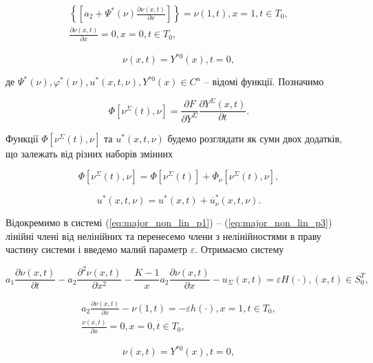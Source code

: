 \begin{equation}
\label{eq:major_non_lin_p2}
\begin{multlined}
\left\{[a_2 + \Psi^*(\nu)\frac{\partial\nu(x, t)}{\partial x}] \right\} = \nu(1, t), x = 1, t\in T_0, \\
\frac{\partial\nu(x, t)}{\partial x} = 0, x = 0, t\in T_0,
\end{multlined}
\end{equation}

\begin{equation}
\label{eq:major_non_lin_p3}
\nu(x, t) = Y^{*0}(x), t = 0,
\end{equation}

де $\Psi^*(\nu), \varphi^*(\nu), u^*(x,t, \nu), Y^{*0}(x) \in C^n$ – відомі функції.
Позначимо

$$\Phi[\nu^\Sigma(t), \nu] = \frac{\partial F}{\partial Y^\Sigma} \frac{\partial Y^\Sigma(x, t)}{\partial t}.$$

Функції $\Phi[\nu^\Sigma(t), \nu]$ та $u^*(x, t, \nu)$ будемо розглядати як суми двох додатків,
що залежать від різних наборів змінних

$$
\Phi[\nu^\Sigma(t), \nu] = \Phi[\nu^\Sigma(t)] + \overline{\Phi}_\nu[\nu^\Sigma(t), \nu],
$$

$$
u^*(x, t, \nu) = u^*(x, t) + \overline{u}_\nu^*(x, t, \nu).
$$

Відокремимо в системі (\ref{eq:major_non_lin_p1}) -- (\ref{eq:major_non_lin_p3}) лінійні члені від нелінійних
та перенесемо члени з
нелінійностями в праву частину системи і введемо малий параметр $\varepsilon$. Отримаємо систему

\begin{equation}
\label{eq:major_non_lin_epsi_p1}
a_1\frac{\partial\nu(x, t)}{\partial t} - a_2\frac{\partial^2\nu(x, t)}{\partial x^2} - \frac{K - 1}{x}a_2
\frac{\partial\nu(x, t)}{\partial x} - u_\Sigma(x, t) = \varepsilon H(\cdot), (x,t) \in S_0^T,
\end{equation}

\begin{equation}
\label{eq:major_non_lin_epsi_p2}
\begin{multlined}
a_2\frac{\partial\nu(x, t)}{\partial x} - \nu(1, t) = - \varepsilon h(\cdot), x = 1, t \in T_0,\\
\frac{\nu(x, t)}{\partial x} = 0, x = 0, t \in T_0,
\end{multlined}
\end{equation}


\begin{equation}
\label{eq:major_non_lin_epsi_p3}
\nu(x, t) = Y^{*0}(x), t = 0,
\end{equation}

